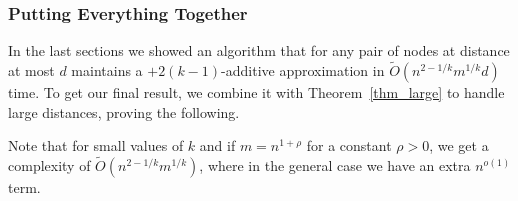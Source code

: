 \documentclass[11pt]{article}
\theoremstyle{definition}
\theoremstyle{remark}
\begin{document}

\subsubsection{Putting Everything Together} \label{sec_summary_additive}

In the last sections we showed an algorithm that for any pair of nodes at distance at most $d$ maintains a $+2(k-1)$-additive approximation in $\tilde{O}(n^{2-1/k}m^{1/k}d)$ time. To get our final result, we combine it with Theorem~\ref{thm_large} to handle large distances, proving the following.

\thmadd*


Note that for small values of $k$ and if $m=n^{1+\rho}$ for a constant $\rho>0$, we get a complexity of $\tilde{O}(n^{2-1/k}m^{1/k})$, where in the general case we have an extra $n^{o(1)}$ term.
\end{document}
